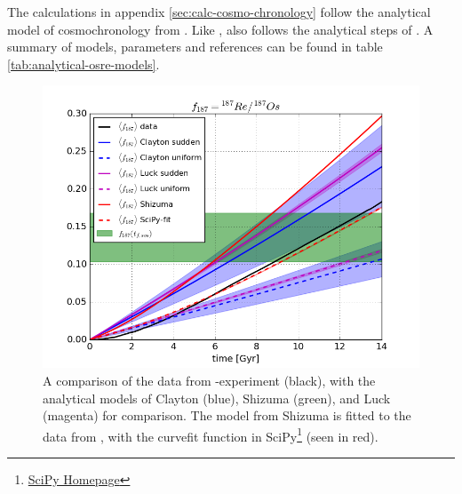 The calculations in appendix \ref{sec:calc-cosmo-chronology} follow the analytical model of cosmochronology from .
Like ,  also follows the analytical steps of .
A summary of models, parameters and references can be found in table \ref{tab:analytical-osre-models}.

\begin{figure}[h]
  \centering
  \includegraphics[width=\figwidth]{results/MCExperiment_revised_2_delmax/model_fitting.png}
  \caption[Analytical models for cosmochronology]{ \label{fig:osre-model-fitting}
    A comparison of the data from \omegamodel-experiment \expone (black), with the analytical models of Clayton (blue), Shizuma (green), and Luck (magenta) for comparison.
    The model from Shizuma is fitted to the data from \omegamodel, with the curvefit function in SciPy\footnote{\href{https://www.scipy.org/}{SciPy Homepage}} (seen in red).
  }
\end{figure}

